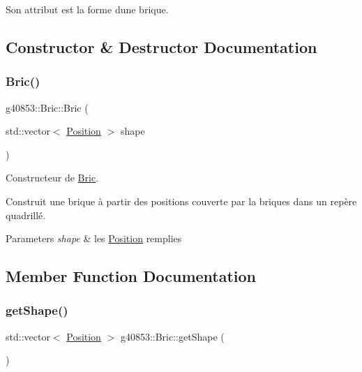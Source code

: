 Son attribut est la forme d\textquotesingle{}une brique. 

\subsection{Constructor \& Destructor Documentation}
\hypertarget{classg40853_1_1_bric_a77e2c56fe648b8418ad19c312f8974e6}{}\label{classg40853_1_1_bric_a77e2c56fe648b8418ad19c312f8974e6} 
\subsubsection{\texorpdfstring{Bric()}{Bric()}}
{\footnotesize\ttfamily g40853\+::\+Bric\+::\+Bric (\begin{DoxyParamCaption}\item[{std\+::vector$<$ \hyperlink{classg40853_1_1_position}{Position} $>$}]{shape }\end{DoxyParamCaption})}



Constructeur de \hyperlink{classg40853_1_1_bric}{Bric}. 

Construit une brique à partir des positions couverte par la briques dans un repère quadrillé.


\begin{DoxyParams}{Parameters}
{\em shape} & les \hyperlink{classg40853_1_1_position}{Position} remplies \\
\hline
\end{DoxyParams}


\subsection{Member Function Documentation}
\hypertarget{classg40853_1_1_bric_a9f35f552f3528ab117a864b230d8bb54}{}\label{classg40853_1_1_bric_a9f35f552f3528ab117a864b230d8bb54} 
\subsubsection{\texorpdfstring{get\+Shape()}{getShape()}}
{\footnotesize\ttfamily std\+::vector$<$ \hyperlink{classg40853_1_1_position}{Position} $>$ g40853\+::\+Bric\+::get\+Shape (\begin{DoxyParamCaption}{ }\end{DoxyParamCaption})\hspace{0.3cm}{\ttfamily [inline]}}



